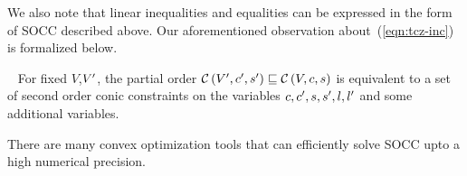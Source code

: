 %
We also note that linear inequalities and equalities can be expressed
in the form of SOCC described above.  Our aforementioned observation
about~(\ref{eqn:tcz-inc}) is formalized below.
%
\begin{lemma}~\label{lem:zon-socc}
For fixed $V$,$V^\prime$, the partial order
$\mathcal{C}\left(V^\prime,c^\prime,s^\prime\right)\sqsubseteq \mathcal{C}\left(V,c,s\right)$ is equivalent to a set
of second order conic constraints on the variables
$c,c^\prime,s,s^\prime,l,l^\prime$ and some additional variables.
\end{lemma}
%
There are many convex optimization tools that can efficiently solve
SOCC upto a high numerical precision.  
